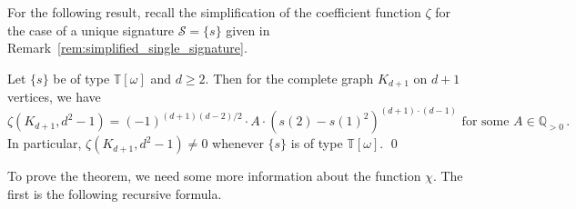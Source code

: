 \documentclass[authorcolumns,numberwithinsect]{no-lipics-v2022}
\begin{document}
For the following result, recall the simplification of the coefficient function $\zeta$ for the case of a unique signature $\mathcal{S}=\{s\}$ given in Remark~\ref{rem:simplified_single_signature}.
\begin{theorem} \label{Thm:Conj_2_false}
Let $\{s\}$ be of type $\mathbb{T}[\omega]$ and $d \geq 2$. Then for the complete graph $K_{d+1}$ on $d+1$ vertices, we have
\begin{equation} \label{eqn:zeta_complete_graph}
\zeta(K_{d+1}, d^2-1) = (-1)^{(d+1)(d-2)/2} \cdot A \cdot (s(2)-s(1)^2)^{(d+1)\cdot(d-1)} \text{ for some } A \in \mathbb{Q}_{>0}\,.
\end{equation}
In particular, $\zeta(K_{d+1}, d^2-1) \neq 0$ whenever $\{s\}$ is  of type $\mathbb{T}[\mathsf{\omega}]$. \qed
\end{theorem}

To prove the theorem, we need some more information about the function $\chi$. The first is the following recursive formula.
\end{document}
